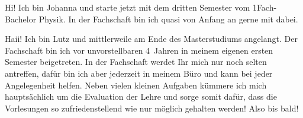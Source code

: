\begin{multicols*}{2}
{Hi! Ich bin Johanna und starte jetzt mit dem dritten Semester vom 1Fach-Bachelor Physik.
In der Fachschaft bin ich quasi von Anfang an gerne mit dabei.
\vspace{3\baselineskip}}

{Haii! Ich bin Lutz und mittlerweile am Ende des Masterstudiums angelangt.
Der Fachschaft bin ich vor unvorstellbaren 4~Jahren in meinem eigenen ersten Semester beigetreten.
In der Fachschaft werdet Ihr mich nur noch selten antreffen, dafür bin ich aber jederzeit in meinem Büro und kann bei jeder Angelegenheit helfen.
Neben vielen kleinen Aufgaben kümmere ich mich hauptsächlich um die Evaluation der Lehre und sorge somit dafür, dass die Vorlesungen so zufriedenstellend wie nur möglich gehalten werden!
Also bis bald!}


\end{multicols*}
